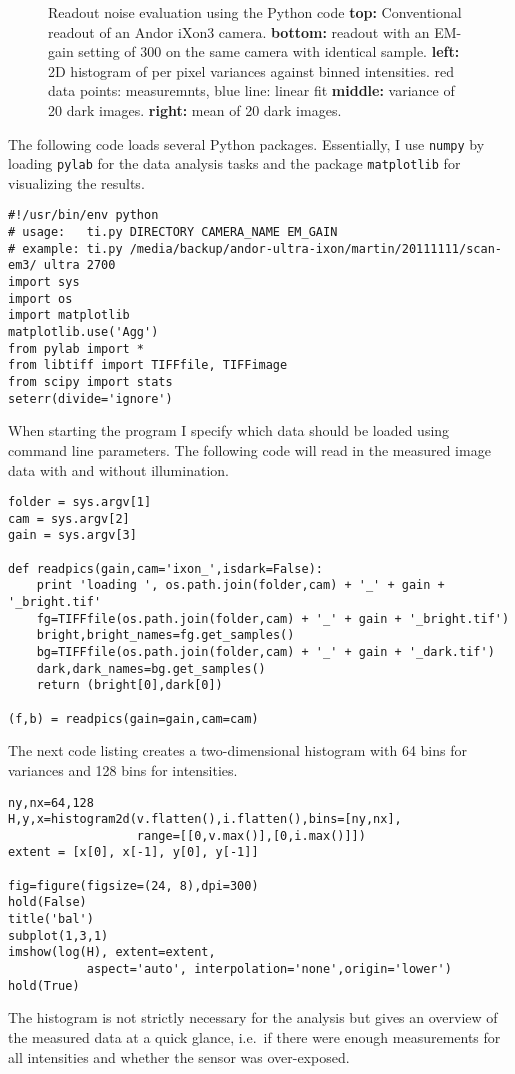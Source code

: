 \begin{figure}[htbp]
  \centering
  \caption{Readout noise evaluation using the Python code {\bf top:}
    Conventional readout of an Andor iXon3 camera. {\bf bottom:}
    readout with an EM-gain setting of 300 on the same camera with
    identical sample. {\bf left:} 2D histogram of per pixel variances
    against binned intensities. red data points: measuremnts, blue
    line: linear fit {\bf middle:} variance of 20 dark images. {\bf
      right:} mean of 20 dark images.}
  \label{fig:ixon}
\end{figure}
The following code loads several Python packages. Essentially, I use
\verb!numpy! by loading \verb!pylab! \citep{Jones} for the data
analysis tasks and the package \verb!matplotlib! \citep{Hunter:2007}
for visualizing the results.
\begin{lstlisting}[style=mypython]
#!/usr/bin/env python
# usage:   ti.py DIRECTORY CAMERA_NAME EM_GAIN
# example: ti.py /media/backup/andor-ultra-ixon/martin/20111111/scan-em3/ ultra 2700
import sys
import os
import matplotlib
matplotlib.use('Agg')
from pylab import *
from libtiff import TIFFfile, TIFFimage
from scipy import stats
seterr(divide='ignore')
\end{lstlisting}
When starting the program I specify which data should be loaded using
command line parameters. The following code will read in the measured
image data with and without illumination.
\begin{lstlisting}[style=mypython]
folder = sys.argv[1]
cam = sys.argv[2]
gain = sys.argv[3]

def readpics(gain,cam='ixon_',isdark=False):
    print 'loading ', os.path.join(folder,cam) + '_' + gain + '_bright.tif'
    fg=TIFFfile(os.path.join(folder,cam) + '_' + gain + '_bright.tif')
    bright,bright_names=fg.get_samples()
    bg=TIFFfile(os.path.join(folder,cam) + '_' + gain + '_dark.tif')    
    dark,dark_names=bg.get_samples()
    return (bright[0],dark[0])

(f,b) = readpics(gain=gain,cam=cam)
\end{lstlisting}
The next code listing creates a two-dimensional histogram with 64 bins
for variances and 128 bins for intensities.
\begin{lstlisting}[style=mypython]
ny,nx=64,128
H,y,x=histogram2d(v.flatten(),i.flatten(),bins=[ny,nx],
                  range=[[0,v.max()],[0,i.max()]])
extent = [x[0], x[-1], y[0], y[-1]] 

fig=figure(figsize=(24, 8),dpi=300)
hold(False)
title('bal')
subplot(1,3,1)
imshow(log(H), extent=extent,
           aspect='auto', interpolation='none',origin='lower')
hold(True)
\end{lstlisting}
The histogram is not strictly necessary for the analysis but gives an
overview of the measured data at a quick glance, i.e.\ if there were
enough measurements for all intensities and whether the sensor was
over-exposed.

